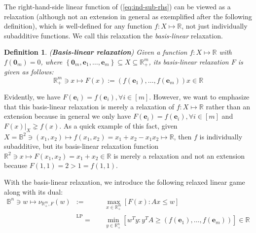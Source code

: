 \documentclass[11pt]{article}\usepackage[]{graphicx}\usepackage[]{xcolor}
\newtheorem{deff}{Definition}
\begin{document}
The right-hand-side linear function of (\ref{eq:ind-sub-rhs}) can be viewed as a relaxation (although not an extension in general as exemplified after the following definition), which is well-defined for any function $f: X\mapsto \mathbb{R}$, not just individually subadditive functions. We call this relaxation the \emph{basis-linear} relaxation.  
\begin{deff}\label{deff:basis-linear-relaxation} (\textbf{Basis-linear relaxation}) Given a function $f: X\mapsto \mathbb{R}$ with $f\left(\mathbf{0}_m\right)=0$, where $\left\{\mathbf{0}_m, \mathbf{e}_1,\dots, \mathbf{e}_m\right\}\subseteq X\subseteq \mathbb{R}^m_{+}$, its basis-linear relaxation $F$ is given as follows:
\[
\mathbb{R}^m_{+}\ni x\mapsto F(x):=(f(\mathbf{e}_1),\dots, f(\mathbf{e}_m))x\in\mathbb{R}
\]
\end{deff}
Evidently, we have $F\left(\mathbf{e}_i\right) =f\left(\mathbf{e}_i\right), \forall i\in [m]$. However, we want to emphasize that this basis-linear relaxation is merely a relaxation of $f: X\mapsto \mathbb{R}$ rather than an extension because in general we only have $F\left(\mathbf{e}_i\right) =f\left(\mathbf{e}_i\right), \forall i\in [m]$ and $F(x)|_X\gneq f(x)$. As a quick example of this fact, given $X=\mathbb{B}^2\ni (x_1, x_2)\mapsto f(x_1, x_2)=x_1+x_2-x_1x_2\mapsto \mathbb{R}$, then $f$ is individually subadditive, but its basis-linear relaxation function $\mathbb{R}^2\ni x\mapsto F(x_1, x_2)=x_1+x_2\in\mathbb{R}$ is merely a relaxation and not an extension because $F(1,1)=2>1=f(1,1)$. 

With the basis-linear relaxation, we introduce the following relaxed linear game along with its dual:
\begin{eqnarray}
\label{eq:NLP-relax-primal}
\mathbb{B}^n\ni w\mapsto \nu_{\mathbb{R}^m_{+}, F}(w)&:=&\max\limits_{x\in \mathbb{R}^m_{+}} \left[F(x): Ax\le w\right] \\
\label{eq:NLP-relax-dual}&\overset{\text{LP duality}}{=}&\min\limits_{y\in \mathbb{R}^n_{+}} \left[w^Ty: y^TA\ge (f(\mathbf{e}_1),\dots, f(\mathbf{e}_m))\right]\in\mathbb{R}
\end{eqnarray}
\end{document}
